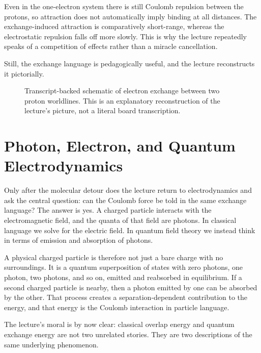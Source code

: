 Even in the one-electron system there is still Coulomb repulsion between the protons, so attraction does not automatically imply binding at all distances. The exchange-induced attraction is comparatively short-range, whereas the electrostatic repulsion falls off more slowly. This is why the lecture repeatedly speaks of a competition of effects rather than a miracle cancellation.

Still, the exchange language is pedagogically useful, and the lecture reconstructs it pictorially.

\begin{figure}[h]
\centering
{}
\caption{Transcript-backed schematic of electron exchange between two proton worldlines. This is an explanatory reconstruction of the lecture's picture, not a literal board transcription.}
\end{figure}

\section{Photon, Electron, and Quantum Electrodynamics}

Only after the molecular detour does the lecture return to electrodynamics and ask the central question: can the Coulomb force be told in the same exchange language? The answer is yes. A charged particle interacts with the electromagnetic field, and the quanta of that field are photons. In classical language we solve for the electric field. In quantum field theory we instead think in terms of emission and absorption of photons.

A physical charged particle is therefore not just a bare charge with no surroundings. It is a quantum superposition of states with zero photons, one photon, two photons, and so on, emitted and reabsorbed in equilibrium. If a second charged particle is nearby, then a photon emitted by one can be absorbed by the other. That process creates a separation-dependent contribution to the energy, and that energy is the Coulomb interaction in particle language.

The lecture's moral is by now clear: classical overlap energy and quantum exchange energy are not two unrelated stories. They are two descriptions of the same underlying phenomenon.

